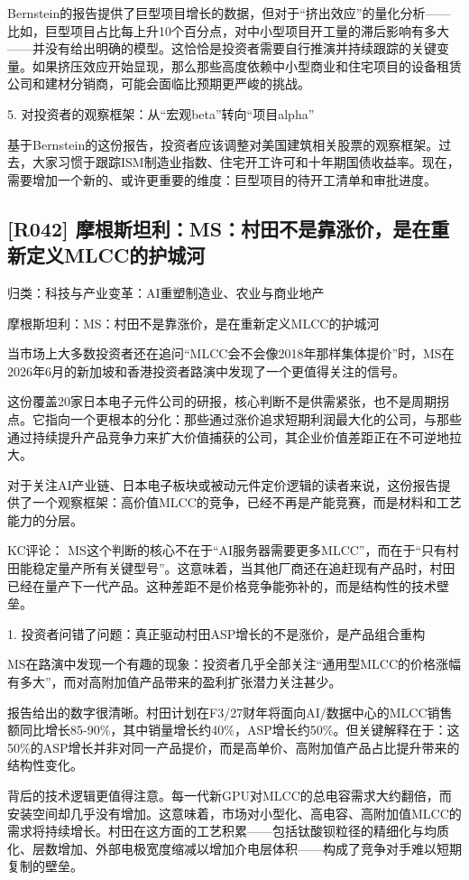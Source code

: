 \documentclass[11pt]{ctexart}
\begin{document}
Bernstein的报告提供了巨型项目增长的数据，但对于“挤出效应”的量化分析——比如，巨型项目占比每上升10个百分点，对中小型项目开工量的滞后影响有多大——并没有给出明确的模型。这恰恰是投资者需要自行推演并持续跟踪的关键变量。如果挤压效应开始显现，那么那些高度依赖中小型商业和住宅项目的设备租赁公司和建材分销商，可能会面临比预期更严峻的挑战。

5. 对投资者的观察框架：从“宏观beta”转向“项目alpha”

基于Bernstein的这份报告，投资者应该调整对美国建筑相关股票的观察框架。过去，大家习惯于跟踪ISM制造业指数、住宅开工许可和十年期国债收益率。现在，需要增加一个新的、或许更重要的维度：巨型项目的待开工清单和审批进度。

\subsection{[R042] 摩根斯坦利：MS：村田不是靠涨价，是在重新定义MLCC的护城河}
{\small\color{refgray}归类：科技与产业变革：AI重塑制造业、农业与商业地产}

摩根斯坦利：MS：村田不是靠涨价，是在重新定义MLCC的护城河

当市场上大多数投资者还在追问“MLCC会不会像2018年那样集体提价”时，MS在2026年6月的新加坡和香港投资者路演中发现了一个更值得关注的信号。

这份覆盖20家日本电子元件公司的研报，核心判断不是供需紧张，也不是周期拐点。它指向一个更根本的分化：那些通过涨价追求短期利润最大化的公司，与那些通过持续提升产品竞争力来扩大价值捕获的公司，其企业价值差距正在不可逆地拉大。

对于关注AI产业链、日本电子板块或被动元件定价逻辑的读者来说，这份报告提供了一个观察框架：高价值MLCC的竞争，已经不再是产能竞赛，而是材料和工艺能力的分层。

KC评论： MS这个判断的核心不在于“AI服务器需要更多MLCC”，而在于“只有村田能稳定量产所有关键型号”。这意味着，当其他厂商还在追赶现有产品时，村田已经在量产下一代产品。这种差距不是价格竞争能弥补的，而是结构性的技术壁垒。

1. 投资者问错了问题：真正驱动村田ASP增长的不是涨价，是产品组合重构

MS在路演中发现一个有趣的现象：投资者几乎全部关注“通用型MLCC的价格涨幅有多大”，而对高附加值产品带来的盈利扩张潜力关注甚少。

报告给出的数字很清晰。村田计划在F3/27财年将面向AI/数据中心的MLCC销售额同比增长85-90\%，其中销量增长约40\%，ASP增长约50\%。但关键解释在于：这50\%的ASP增长并非对同一产品提价，而是高单价、高附加值产品占比提升带来的结构性变化。

背后的技术逻辑更值得注意。每一代新GPU对MLCC的总电容需求大约翻倍，而安装空间却几乎没有增加。这意味着，市场对小型化、高电容、高附加值MLCC的需求将持续增长。村田在这方面的工艺积累——包括钛酸钡粒径的精细化与均质化、层数增加、外部电极宽度缩减以增加介电层体积——构成了竞争对手难以短期复制的壁垒。
\end{document}
